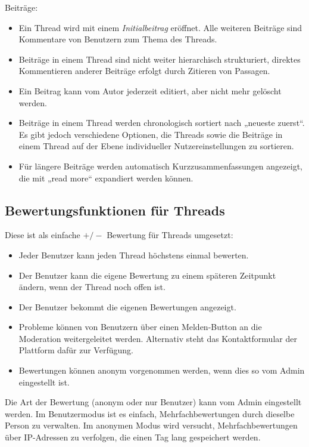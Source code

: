 \documentclass[11pt,a4paper,twoside]{article}
\begin{document}
Beiträge:
\begin{itemize}\itemsep0pt
\item Ein Thread wird mit einem \emph{Initialbeitrag} eröffnet. Alle weiteren
  Beiträge sind Kommentare von Benutzern zum Thema des Threads.
\item Beiträge in einem Thread sind nicht weiter hierarchisch strukturiert,
  direktes Kommentieren anderer Beiträge erfolgt durch Zitieren von Passagen.
\item Ein Beitrag kann vom Autor jederzeit editiert, aber nicht mehr gelöscht
  werden.
\item Beiträge in einem Thread werden chronologisch sortiert nach „neueste
  zuerst“. Es gibt jedoch verschiedene Optionen, die Threads sowie die Beiträge
  in einem Thread auf der Ebene individueller Nutzereinstellungen zu sortieren.
\item Für längere Beiträge werden automatisch Kurzzusammenfassungen angezeigt,
  die mit „read more“ expandiert werden können.
\end{itemize}

\subsection*{Bewertungsfunktionen für Threads} 

Diese ist als einfache $+/-$ Bewertung für Threads umgesetzt:
\begin{itemize}\itemsep0pt
\item Jeder Benutzer kann jeden Thread höchstens einmal bewerten.
\item Der Benutzer kann die eigene Bewertung zu einem späteren Zeitpunkt
  ändern, wenn der Thread noch offen ist.
\item Der Benutzer bekommt die eigenen Bewertungen angezeigt.
\item Probleme können von Benutzern über einen Melden-Button an die Moderation
  weitergeleitet werden. Alternativ steht das Kontaktformular der Plattform
  dafür zur Verfügung. 
\item Bewertungen können anonym vorgenommen werden, wenn dies so vom Admin
  eingestellt ist.
\end{itemize}
Die Art der Bewertung (anonym oder nur Benutzer) kann vom Admin eingestellt
werden. Im Benutzermodus ist es einfach, Mehrfachbewertungen durch dieselbe
Person zu verwalten. Im anonymen Modus wird versucht, Mehrfachbewertungen über
IP-Adressen zu verfolgen, die einen Tag lang gespeichert werden. 
\end{document}
